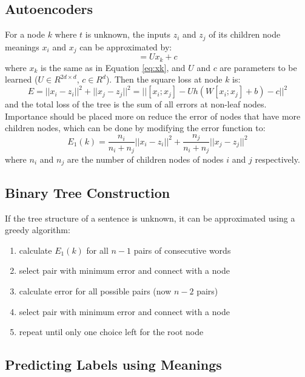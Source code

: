 \documentclass{article}
\begin{document}
\subsection{Autoencoders}
For a node $k$ where $t$ is unknown, the inputs $z_i$ and $z_j$ of its children node meanings $x_i$ and $x_j$ can be approximated by:
\begin{equation}
    [z_i ; z_j] = U x_k + c
\end{equation}
where $x_k$ is the same as in Equation \ref{eq:xk}, and $U$ and $c$ are parameters to be learned ($U \in R^{2d \times d}$, $c \in R^d$). Then the square loss at node $k$ is:
\begin{equation}
    E = ||x_i - z_i||^2 + ||x_j - z_j||^2 = || [x_i;x_j] - U h(W[x_i; x_j] + b) - c||^2
\end{equation}
and the total loss of the tree is the sum of all errors at non-leaf nodes. Importance should be placed more on reduce the error of nodes that have more children nodes, which can be done by modifying the error function to:
\begin{equation}
    E_1 (k) = \frac{n_i}{n_i + n_j} ||x_i - z_i||^2 + \frac{n_j}{n_i + n_j} ||x_j - z_j||^2
\end{equation}
where $n_i$ and $n_j$ are the number of children nodes of nodes $i$ and $j$ respectively.


\subsection{Binary Tree Construction}
If the tree structure of a sentence is unknown, it can be approximated using a greedy algorithm:
\begin{enumerate}
    \item calculate $E_1(k)$ for all $n - 1$ pairs of consecutive words
    \item select pair with minimum error and connect with a node
    \item calculate error for all possible pairs (now $n-2$ pairs)
    \item select pair with minimum error and connect with a node
    \item repeat until only one choice left for the root node
\end{enumerate}


\subsection{Predicting Labels using Meanings}
\end{document}
